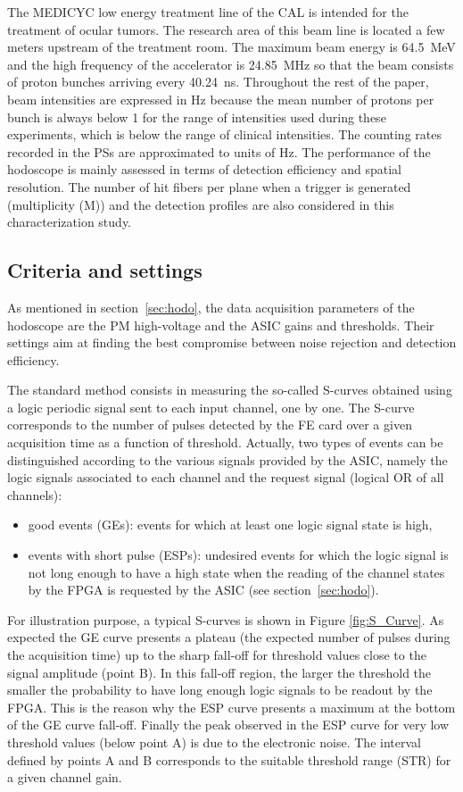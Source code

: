 \documentclass[a4paper,11pt]{article}
\begin{document}
The MEDICYC low energy treatment line of the CAL is intended for the treatment of ocular tumors. The research area of this beam line is located a few meters upstream of the treatment room. The maximum beam energy is 64.5~MeV and the high frequency of the accelerator is 24.85~MHz so that the beam consists of proton bunches arriving every 40.24~ns. Throughout the rest of the paper, beam intensities are expressed in Hz because the mean number of protons per bunch is always below 1 for the range of intensities used during these experiments, which is below the range of clinical intensities. The counting rates recorded in the PSs are approximated to units of Hz.
The performance of the hodoscope is mainly assessed in terms of detection efficiency and spatial resolution. The number of hit fibers per plane when a trigger is generated (multiplicity (M)) and the detection profiles are also considered in this characterization study.

\subsection{Criteria and settings}
\label{sec:Settings}

As mentioned in section~\ref{sec:hodo}, the data acquisition parameters of the hodoscope are the PM high-voltage and the ASIC gains and thresholds. Their settings aim at finding the best compromise between noise rejection and detection efficiency.

The standard method consists in measuring the so-called S-curves obtained using a logic periodic signal sent to each input channel, one by one. The S-curve corresponds to the number of pulses detected by the FE card over a given acquisition time as a function of threshold. Actually, two types of events can be distinguished according to the various signals provided by the ASIC, namely the logic signals associated to each channel and the request signal (logical OR of all channels):
\begin{itemize}
  \item good events (GEs): events for which at least one logic signal state is high, 
  \item events with short pulse (ESPs): undesired events for which the logic signal is not long enough to have a high state when the reading of the channel states by the FPGA is requested by the ASIC (see section~\ref{sec:hodo}).
\end{itemize}

For illustration purpose, a typical S-curves is shown in Figure \ref{fig:S_Curve}. As expected the GE curve presents a plateau (the expected number of pulses during the acquisition time) up to the sharp fall-off for threshold values close to the signal amplitude (point B). In this fall-off region, the larger the threshold the smaller the probability to have long enough logic signals to be readout by the FPGA. This is the reason why the ESP curve presents a maximum at the bottom of the GE curve fall-off. Finally the peak observed in the ESP curve for very low threshold values (below point A) is due to the electronic noise. The interval defined by points A and B corresponds to the suitable threshold range (STR) for a given channel gain.
\end{document}
